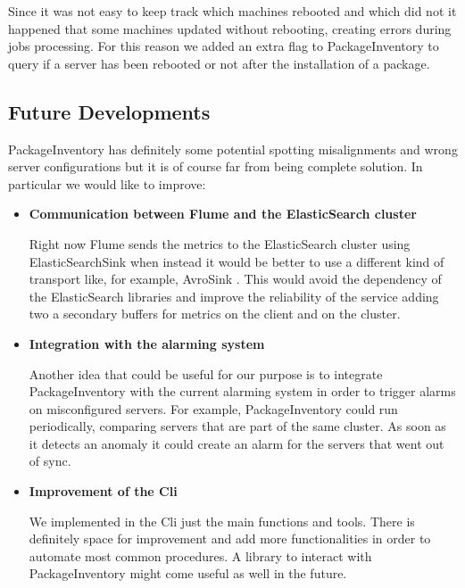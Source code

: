   Since it was not easy to keep track which machines rebooted and which
  did not it happened that some machines updated without rebooting,
  creating errors during jobs processing. For this reason we added an
  extra flag to PackageInventory to query if a server has been rebooted or
  not after the installation of a package.

\subsection{Future Developments}

PackageInventory has definitely some potential spotting misalignments and
wrong server configurations but it is of course far from being complete
solution. In particular we would like to improve:

\begin{itemize}  

  \item \textbf{Communication between Flume and the ElasticSearch cluster}

  Right now Flume sends the metrics to the ElasticSearch cluster using
  ElasticSearchSink \cite{elasticSearchSink} when instead it would be
  better to use a different kind of transport like, for example, AvroSink
  \cite{avroSink}. This would avoid the dependency of the ElasticSearch
  libraries and improve the reliability of the service adding two
  a secondary buffers for metrics on the client and on the cluster.

  \item \textbf{Integration with the alarming system}

  Another idea that could be useful for our purpose is to integrate
  PackageInventory with the current alarming system in order to trigger
  alarms on misconfigured servers. For example, PackageInventory could run
  periodically, comparing servers that are part of the same cluster. As
  soon as it detects an anomaly it could create an alarm for the servers
  that went out of sync.

  \item \textbf{Improvement of the Cli}

  We implemented in the Cli just the main functions and tools. There is
  definitely space for improvement and add more functionalities in order
  to automate most common procedures. A library to interact with
  PackageInventory might come useful as well in the future.

\end{itemize}


